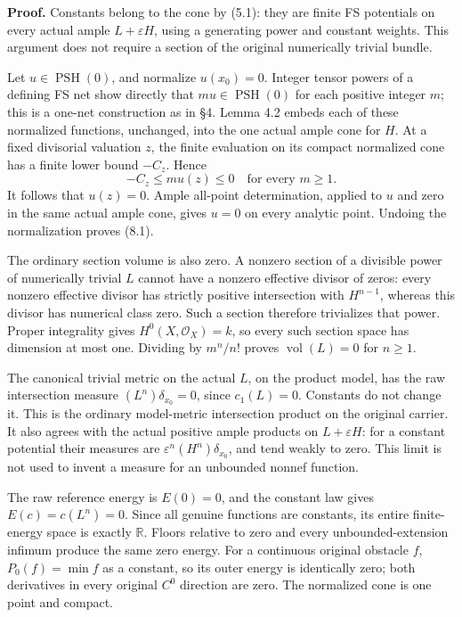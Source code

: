 \documentclass[10pt]{article}
\begin{document}
\textbf{Proof.} Constants belong to the cone by (5.1): they are finite
FS potentials on every actual ample \(L+\varepsilon H\), using a
generating power and constant weights. This argument does not require a
section of the original numerically trivial bundle.

Let \(u\in\operatorname{PSH}(0)\), and normalize \(u(x_0)=0\). Integer
tensor powers of a defining FS net show directly that
\(m u\in\operatorname{PSH}(0)\) for each positive integer \(m\); this is
a one-net construction as in §4. Lemma 4.2 embeds each of these
normalized functions, unchanged, into the one actual ample cone for
\(H\). At a fixed divisorial valuation \(z\), the finite evaluation on
its compact normalized cone has a finite lower bound \(-C_z\). Hence \[
 -C_z\leq m u(z)\leq0\quad\text{for every }m\geq1.
\] It follows that \(u(z)=0\). Ample all-point determination, applied to
\(u\) and zero in the same actual ample cone, gives \(u=0\) on every
analytic point. Undoing the normalization proves (8.1).

The ordinary section volume is also zero. A nonzero section of a
divisible power of numerically trivial \(L\) cannot have a nonzero
effective divisor of zeros: every nonzero effective divisor has strictly
positive intersection with \(H^{n-1}\), whereas this divisor has
numerical class zero. Such a section therefore trivializes that power.
Proper integrality gives \(H^0(X,\mathcal O_X)=k\), so every such
section space has dimension at most one. Dividing by \(m^n/n!\) proves
\(\operatorname{vol}(L)=0\) for \(n\geq1\).

The canonical trivial metric on the actual \(L\), on the product model,
has the raw intersection measure \((L^n)\delta_{x_0}=0\), since
\(c_1(L)=0\). Constants do not change it. This is the ordinary
model-metric intersection product on the original carrier. It also
agrees with the actual positive ample products on \(L+\varepsilon H\):
for a constant potential their measures are
\(\varepsilon^n(H^n)\delta_{x_0}\), and tend weakly to zero. This limit
is not used to invent a measure for an unbounded nonnef function.

The raw reference energy is \(E(0)=0\), and the constant law gives
\(E(c)=c(L^n)=0\). Since all genuine functions are constants, its entire
finite-energy space is exactly \(\mathbb R\). Floors relative to zero
and every unbounded-extension infimum produce the same zero energy. For
a continuous original obstacle \(f\), \(P_0(f)=\min f\) as a constant,
so its outer energy is identically zero; both derivatives in every
original \(C^0\) direction are zero. The normalized cone is one point
and compact.
\end{document}
